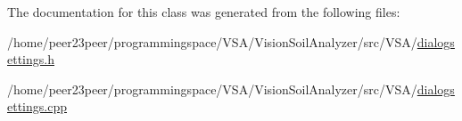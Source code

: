 The documentation for this class was generated from the following files\+:\begin{DoxyCompactItemize}
\item 
/home/peer23peer/programmingspace/\+V\+S\+A/\+Vision\+Soil\+Analyzer/src/\+V\+S\+A/\hyperlink{dialogsettings_8h}{dialogsettings.\+h}\item 
/home/peer23peer/programmingspace/\+V\+S\+A/\+Vision\+Soil\+Analyzer/src/\+V\+S\+A/\hyperlink{dialogsettings_8cpp}{dialogsettings.\+cpp}\end{DoxyCompactItemize}
